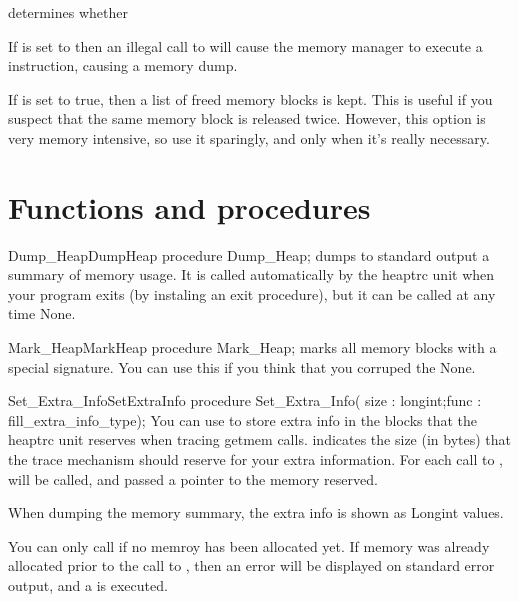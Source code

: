  determines whether

If  is set to  then an illegal call to 
 will cause the memory manager to execute a  
instruction, causing a memory dump.

If  is set to true, then a list of freed memory 
blocks is kept. This is useful if you suspect that the same memory block is
released twice. However, this option is very memory intensive, so use it
sparingly, and only when it's really necessary.

\section{Functions and procedures}

\begin{procedurel}{Dump\_Heap}{DumpHeap}
\Declaration 
procedure Dump\_Heap;
\Description
{} dumps to standard output a summary of memory usage.
It is called automatically by the heaptrc unit when your program exits
(by instaling an exit procedure), but it can be called at any time
\Errors
None.
\SeeAlso
{}
\end{procedurel}

\begin{procedurel}{Mark\_Heap}{MarkHeap}
\Declaration
procedure Mark\_Heap;
\Description
{} marks all memory blocks with a special signature.
You can use this if you think that you corruped the
\Errors
None.
\SeeAlso
{}
\end{procedurel}

\begin{procedurel}{Set\_Extra\_Info}{SetExtraInfo}
\Declaration
procedure Set\_Extra\_Info( size : longint;func : fill\_extra\_info\_type);
\Description
You can use  to store extra info in the blocks that
the heaptrc unit reserves when tracing getmem calls.  indicates the
size (in bytes) that the trace mechanism should reserve for your extra
information. For each call to ,  will be called,
and passed a pointer to the memory reserved. 

When dumping the memory summary, the extra info is shown as Longint values.

\Errors
You can only call  if no memroy has been allocated
yet. If memory was already allocated prior to the call to
, then an error will be displayed on standard error
output, and a  is executed.
\SeeAlso
{}
\end{procedurel}

\html{}


%
%
%